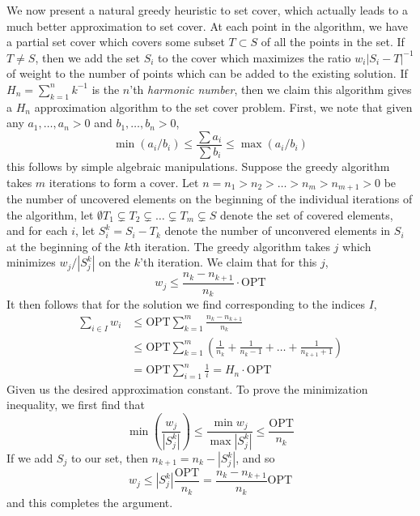 We now present a natural greedy heuristic to set cover, which actually leads to a much better approximation to set cover. At each point in the algorithm, we have a partial set cover which covers some subset $T \subset S$ of all the points in the set. If $T \neq S$, then we add the set $S_i$ to the cover which maximizes the ratio $w_i|S_i - T|^{-1}$ of weight to the number of points which can be added to the existing solution. If $H_n = \sum_{k = 1}^n k^{-1}$ is the $n$'th {\it harmonic number}, then we claim this algorithm gives a $H_n$ approximation algorithm to the set cover problem. First, we note that given any $a_1, \dots, a_n > 0$ and $b_1, \dots, b_n > 0$,
%
\[ \min (a_i/b_i) \leq \frac{\sum a_i}{\sum b_i} \leq \max (a_i/b_i) \]
%
this follows by simple algebraic manipulations. Suppose the greedy algorithm takes $m$ iterations to form a cover. Let $n = n_1 > n_2 > \dots > n_m > n_{m+1} > 0$ be the number of uncovered elements on the beginning of the individual iterations of the algorithm, let $\emptyset T_1 \subsetneq T_2 \subsetneq \dots \subsetneq T_m \subsetneq S$ denote the set of covered elements, and for each $i$, let $S_i^k = S_i - T_k$ denote the number of unconvered elements in $S_i$ at the beginning of the $k$th iteration. The greedy algorithm takes $j$ which minimizes $w_j/|S_j^k|$ on the $k$'th iteration. We claim that for this $j$,
%
\[ w_j \leq \frac{n_k - n_{k+1}}{n_k} \cdot \text{OPT} \]
%
It then follows that for the solution we find corresponding to the indices $I$,
%
\begin{align*}
    \sum_{i \in I} w_i &\leq \text{OPT} \sum_{k = 1}^m \frac{n_k - n_{k+1}}{n_k}\\
    &\leq \text{OPT} \sum_{k = 1}^m \left( \frac{1}{n_k} + \frac{1}{n_k - 1} + \dots + \frac{1}{n_{k+1} + 1} \right)\\
    &= \text{OPT} \sum_{i = 1}^n \frac{1}{i} = H_n \cdot \text{OPT}
\end{align*}
%
Given us the desired approximation constant. To prove the minimization inequality, we first find that
%
\[ \min \left( \frac{w_j}{|S^k_j|} \right) \leq \frac{\min w_j}{\max |S^k_j|} \leq \frac{\text{OPT}}{n_k} \]
%
If we add $S_j$ to our set, then $n_{k+1} = n_k - |S^k_j|$, and so
%
\[ w_j \leq |S^k_j| \frac{\text{OPT}}{n_k} = \frac{n_k - n_{k+1}}{n_k} \text{OPT} \]
%
and this completes the argument.

